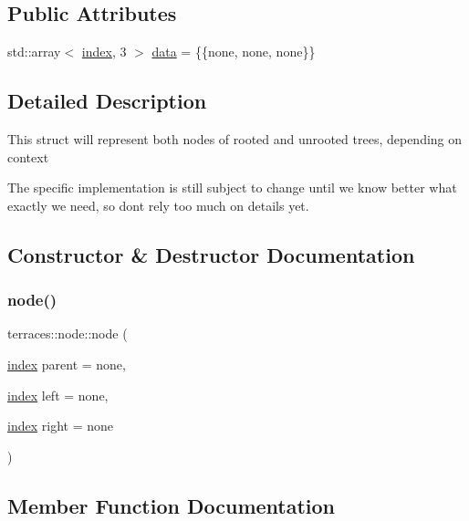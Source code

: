 \subsection*{Public Attributes}
\begin{DoxyCompactItemize}
\item 
std\+::array$<$ \hyperlink{namespaceterraces_adbc33ccb543d1634e96d0eb02e472c77}{index}, 3 $>$ \hyperlink{structterraces_1_1node_aee217f5c4b1af9fc69f59b278f656663}{data} = \{\{none, none, none\}\}
\end{DoxyCompactItemize}


\subsection{Detailed Description}
This struct will represent both nodes of rooted and unrooted trees, depending on context

The specific implementation is still subject to change until we know better what exactly we need, so don\textquotesingle{}t rely too much on details yet. 

\subsection{Constructor \& Destructor Documentation}
\mbox{\label{structterraces_1_1node_aeeaecca04dbbd90b944666d8e1a5c3dc}} 
\subsubsection{\texorpdfstring{node()}{node()}}
{\footnotesize\ttfamily terraces\+::node\+::node (\begin{DoxyParamCaption}\item[{\hyperlink{namespaceterraces_adbc33ccb543d1634e96d0eb02e472c77}{index}}]{parent = {\ttfamily none},  }\item[{\hyperlink{namespaceterraces_adbc33ccb543d1634e96d0eb02e472c77}{index}}]{left = {\ttfamily none},  }\item[{\hyperlink{namespaceterraces_adbc33ccb543d1634e96d0eb02e472c77}{index}}]{right = {\ttfamily none} }\end{DoxyParamCaption})\hspace{0.3cm}{\ttfamily [inline]}}



\subsection{Member Function Documentation}
\mbox{\label{structterraces_1_1node_a934dadc0e2108504ac7634300d27c3b0}} 
